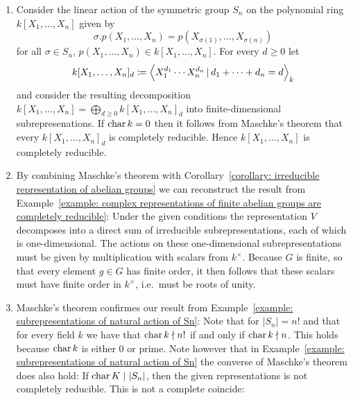 \begin{example}
  \leavevmode
  \begin{enumerate}
    \item
      Consider the linear action of the symmetric group $S_n$ on the polynomial ring $k[X_1, \dotsc, X_n]$ given by
      \[
          \sigma.p(X_1, \dotsc, X_n)
        = p(X_{\sigma(1)}, \dotsc, X_{\sigma(n)})
      \]
      for all $\sigma \in S_n$, $p(X_1, \dotsc, X_n) \in k[X_1, \dotsc, X_n]$.
      For every $d \geq 0$ let
      \[
                  k[X_1, \dotsc, X_n]_d
        \defined  \gen{
                    X_1^{d_1} \dotsm X_n^{d_n}
                  \suchthat
                    d_1 + \dotsb + d_n = d
                  }_k
      \]
      and consider the resulting decomposition $k[X_1, \dotsc, X_n] = \bigoplus_{d \geq 0} k[X_1, \dotsc, X_n]_d$ into finite-dimensional subrepresenations.
      If $\operatorname{char} k = 0$ then it follows from Maschke’s theorem that every $k[X_1, \dotsc, X_n]_d$ is completely reducible.
      Hence $k[X_1, \dotsc, X_n]$ is completely reducible.
    \item
      By combining Maschke’s theorem with Corollary~\ref{corollary: irreducible representation of abelian groups} we can reconstruct the result from Example~\ref{example: complex representations of finite abelian groups are completely reducible}:
      Under the given conditions the representation $V$ decomposes into a direct sum of irreducible subrepresentations, each of which is one-dimensional.
      The actions on these one-dimensional subrepresentations must be given by multiplication with scalars from $k^\times$.
      Because $G$ is finite, so that every element $g \in G$ has finite order, it then follows that these scalars must have finite order in $k^\times$, i.e.\ must be roots of unity.
      
    \item
      Maschke’s theorem confirmes our result from Example~\ref{example: subrepresentations of natural action of Sn}:
      Note that for $|S_n| = n!$ and that for every field $k$ we have that $\operatorname{char} k \nmid n!$ if and only if $\operatorname{char} k \nmid n$.
      This holds because $\operatorname{char} k$ is either $0$ or prime.
      Note however that in Example~\ref{example: subrepresentations of natural action of Sn} the converse of Maschke’s theorem does also hold:
      If $\operatorname{char} K \mid |S_n|$, then the given representations is not completely reducible.
      This is not a complete coincide:
  \end{enumerate}
\end{example}


